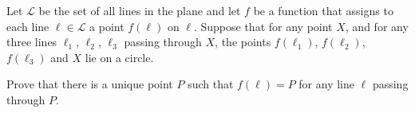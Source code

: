Let $\mathcal{L}$ be the set of all lines in the plane and let $f$ be a function that assigns to each line $\ell \in \mathcal{L}$ a point $f(\ell)$ on $\ell$. Suppose that for any point $X$, and for any three lines $\ell_1$, $\ell_2$, $\ell_3$ passing through $X$, the points $f(\ell_1)$, $f(\ell_2)$, $f(\ell_3)$ and $X$ lie on a circle.

Prove that there is a unique point $P$ such that $f(\ell) = P$ for any line $\ell$ passing through $P$.

